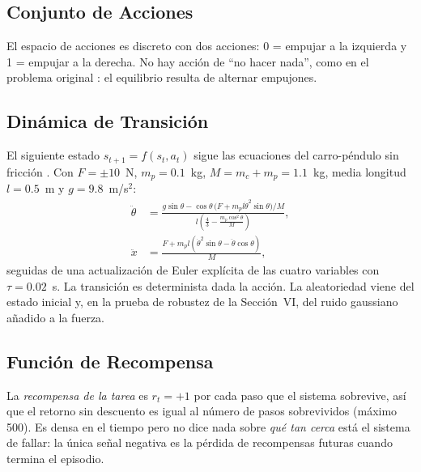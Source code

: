 \documentclass[conference]{IEEEtran}
\begin{document}
\subsection{Conjunto de Acciones}
El espacio de acciones es discreto con dos acciones: 0 = empujar a la izquierda y 1 =
empujar a la derecha. No hay acción de ``no hacer nada'', como en el problema original
\cite{barto1983}: el equilibrio resulta de alternar empujones.

\subsection{Dinámica de Transición}
El siguiente estado $s_{t+1} = f(s_t, a_t)$ sigue las ecuaciones del carro-péndulo sin
fricción \cite{barto1983}. Con $F = \pm 10$~N, $m_p = 0.1$~kg, $M = m_c + m_p = 1.1$~kg,
media longitud $l = 0.5$~m y $g = 9.8$~m/s$^2$:
\begin{align}
\ddot\theta &= \frac{g\sin\theta - \cos\theta\,\big(F + m_p l \dot\theta^2 \sin\theta\big)/M}
                    {l\left(\frac{4}{3} - \frac{m_p\cos^2\theta}{M}\right)}, \\
\ddot x &= \frac{F + m_p l\left(\dot\theta^2\sin\theta - \ddot\theta\cos\theta\right)}{M},
\end{align}
seguidas de una actualización de Euler explícita de las cuatro variables con
$\tau = 0.02$~s. La transición es determinista dada la acción. La aleatoriedad viene del
estado inicial y, en la prueba de robustez de la Sección~VI, del ruido gaussiano añadido a
la fuerza.

\subsection{Función de Recompensa}
La \emph{recompensa de la tarea} es $r_t = +1$ por cada paso que el sistema sobrevive, así
que el retorno sin descuento es igual al número de pasos sobrevividos (máximo 500). Es densa
en el tiempo pero no dice nada sobre \emph{qué tan cerca} está el sistema de fallar: la única
señal negativa es la pérdida de recompensas futuras cuando termina el episodio.
\end{document}
